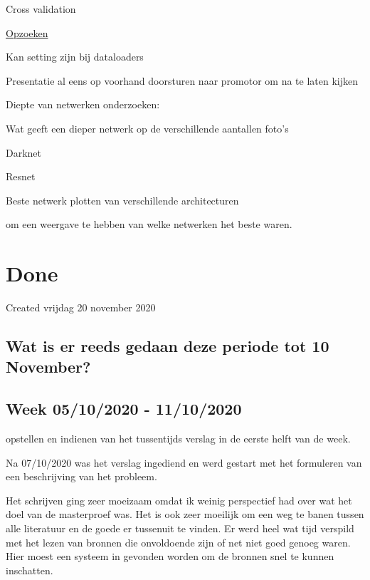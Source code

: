 \documentclass{article}
\begin{document}
Cross validation

	\uline{Opzoeken} 
	
	Kan setting zijn bij dataloaders
	
	



Presentatie al eens op voorhand doorsturen naar promotor om na te laten kijken



Diepte van netwerken onderzoeken:

	Wat geeft een dieper netwerk op de verschillende aantallen foto's
	
	Darknet
	
	Resnet 
	


Beste netwerk plotten van verschillende architecturen

	om een weergave te hebben van welke netwerken het beste waren. 
	
	




		\section{Done}

Created vrijdag 20 november 2020



\subsection{Wat is er reeds gedaan deze periode tot 10 November?}



\subsection{Week 05/10/2020 - 11/10/2020}

opstellen en indienen van het tussentijds verslag in de eerste helft van de week.

Na 07/10/2020 was het verslag ingediend en werd gestart met het formuleren van een beschrijving van het probleem.

Het schrijven ging zeer moeizaam omdat ik weinig perspectief had over wat het doel van de masterproef was. Het is ook zeer moeilijk om een weg te banen tussen alle literatuur en de goede er tussenuit te vinden. Er werd heel wat tijd verspild met het lezen van bronnen die onvoldoende zijn of net niet goed genoeg waren. Hier moest een systeem in gevonden worden om de bronnen snel te kunnen inschatten. 
\end{document}
